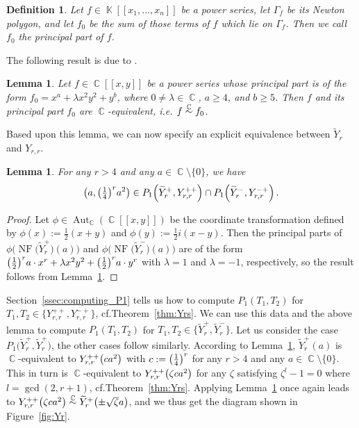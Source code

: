 \documentclass[noend]{amsproc}
\newtheorem{defn}[theorem]{Definition}
\newtheorem{lemma}[theorem]{Lemma}
\theoremstyle{definition}
\let\originalleft\left
\let\originalright\right
\renewcommand{\left}{\mathopen{}\mathclose\bgroup\originalleft}
\renewcommand{\right}{\aftergroup\egroup\originalright}
\newcommand{\tY}{\widetilde{Y}}
\DeclareMathOperator{\C}{\mathbb{C}}
\DeclareMathOperator{\K}{\mathbb{K}}
\DeclareMathOperator{\NF}{NF}
\DeclareMathOperator{\Aut}{Aut}
\newcommand{\csim}{\ensuremath{\mathrel{%
  \raisebox{0pt}[\heightof{$\overset{\scriptscriptstyle\C}{\sim}$}]{%
    $\overset{\C}{\sim}$%
  }%
}}}
\begin{document}
\begin{defn}
Let $f \in \K[[x_1,\ldots,x_n]]$ be a power series, let $\Gamma_f$ be its
Newton polygon, and let $f_0$ be the sum of those terms of $f$ which lie on
$\Gamma_f$. Then we call $f_0$ the principal part of $f$.
\end{defn}

The following result is due to \citet[Corollary~9.9]{A1974}.

\begin{lemma}\label{lem:principalpart}
Let $f \in \C[[x,y]]$ be a power series whose principal part is of the form
$f_0 = x^a+\lambda x^2y^2+y^b$, where $0 \neq \lambda \in \C$, $a \geq 4$, and
$b \geq 5$. Then $f$ and its principal part $f_0$ are $\C$-equivalent, i.e.\@
$f \csim f_0$.
\end{lemma}

Based upon this lemma, we can now specify an explicit equivalence between
$\tY_r$ and $Y_{r,r}$.

\begin{lemma}\label{lem:Yr_equivalences}
For any $r > 4$ and any $a \in \C \setminus \{0\}$, we have
\[
\left(a, \left(\textstyle\frac{1}{4}\right)^r a^2\right)
\in P_1\left(\tY_r^+, Y_{r,r}^{++}\right)
\cap P_1\left(\tY_r^-, Y_{r,r}^{-+}\right) \,.
\]
\end{lemma}

\begin{proof}
Let $\phi \in \Aut_{\C}(\C[[x,y]])$ be the coordinate transformation defined by
$\phi(x) := \frac{1}{2}(x+y)$ and $\phi(y) := \frac{1}{2}i(x-y)$. Then the
principal parts of $\phi\bigl(\NF\bigl(\tY_r^+\bigr)(a)\bigr)$ and
$\phi\bigl(\NF\bigl(\tY_r^-\bigr)(a)\bigr)$ are of the form
$\left(\frac{1}{2}\right)^r a \cdot x^r + \lambda x^2 y^2
+ \left(\frac{1}{2}\right)^r a \cdot y^r$
with $\lambda = 1$ and $\lambda = -1$, respectively, so the result follows from
Lemma~\ref{lem:principalpart}.
\end{proof}

Section~\ref{ssec:computing_P1} tells us how to compute $P_1(T_1, T_2)$ for
$T_1, T_2 \in \{Y_{r,r}^{++}, Y_{r,r}^{-+}\}$, cf.\@ Theorem~\ref{thm:Yrs}. We
can use this data and the above lemma to compute $P_1(T_1, T_2)$ for
$T_1, T_2 \in \bigl\{\tY_r^+, \tY_r^-\bigr\}$. Let us consider the case
$P_1\bigl(\tY_r^+, \tY_r^+\bigr)$, the other cases follow similarly. According
to Lemma~\ref{lem:Yr_equivalences}, $\tY_r^+(a)$ is $\C$-equivalent to
$Y_{r,r}^{++}\left(ca^2\right)$ with $c := \left(\frac{1}{4}\right)^r$ for any
$r > 4$ and any $a \in \C \setminus \{0\}$. This in turn is $\C$-equivalent to
$Y_{r,r}^{++}\left(\zeta ca^2\right)$ for any $\zeta$ satisfying
$\zeta^l-1 = 0$ where $l = \gcd(2, r+1)$, cf.\@ Theorem~\ref{thm:Yrs}. Applying
Lemma~\ref{lem:Yr_equivalences} once again leads to
$Y_{r,r}^{++}\left(\zeta ca^2\right)
\csim \tY_r^+\left(\pm \sqrt{\zeta}a\right)$, and we thus get the diagram shown
in Figure~\ref{fig:Yr}.
\end{document}
